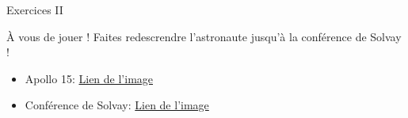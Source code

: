 \documentclass[10pt,svgnames,usenames,table]{beamer}
\begin{document}
	\begin{frame}{Exercices II}
	\begin{center}
		À vous de jouer ! Faites redescrendre l'astronaute jusqu'à la conférence de Solvay !
		\begin{itemize}
			\item Apollo 15: \href{http://louvainlinux.github.io/atelier-gimp/src/Images/purge/Apollo_15_flag,_rover,_LM,_Irwin.jpg}{Lien de l'image}
			\item Conférence de Solvay: \href{http://louvainlinux.github.io/atelier-gimp/src/Images/mask/Conference_Solvay_Original.jpg}{Lien de l'image}
		\end{itemize}
	\end{center}
	\end{frame}

		
\end{document}

